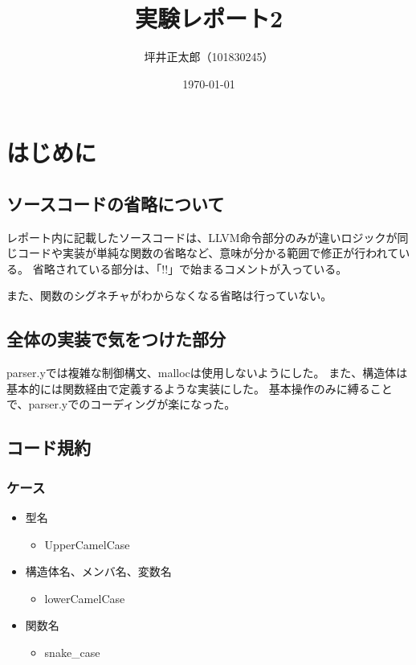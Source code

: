 \documentclass[a4paper,12pt]{jsarticle}
\begin{document}
\title{実験レポート2}
\author{坪井正太郎（101830245）}
\date{\today}
\maketitle
\section{はじめに}
\subsection{ソースコードの省略について}
レポート内に記載したソースコードは、LLVM命令部分のみが違いロジックが同じコードや実装が単純な関数の省略など、意味が分かる範囲で修正が行われている。
省略されている部分は、「!!」で始まるコメントが入っている。

また、関数のシグネチャがわからなくなる省略は行っていない。

\subsection{全体の実装で気をつけた部分}
parser.yでは複雑な制御構文、mallocは使用しないようにした。
また、構造体は基本的には関数経由で定義するような実装にした。
基本操作のみに縛ることで、parser.yでのコーディングが楽になった。

\subsection{コード規約}
\subsubsection*{ケース}
\begin{itemize}
  \item 型名
        \begin{itemize}
          \item UpperCamelCase
        \end{itemize}
  \item 構造体名、メンバ名、変数名
        \begin{itemize}
          \item lowerCamelCase
        \end{itemize}
  \item 関数名
        \begin{itemize}
          \item snake\_case
        \end{itemize}
\end{itemize}
\end{document}

